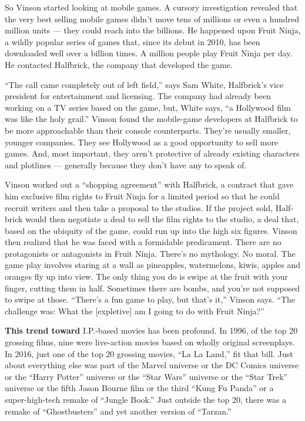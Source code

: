 So Vinson started looking at mobile games. A cursory investigation
revealed that the very best selling mobile games didn't move tens of
millions or even a hundred million units --- they could reach into the
billions. He happened upon Fruit Ninja, a wildly popular series of games
that, since its debut in 2010, has been downloaded well over a billion
times. A million people play Fruit Ninja per day. He contacted
Half­brick, the company that developed the game.

``The call came completely out of left field,'' says Sam White,
Half­brick's vice president for entertainment and licensing. The company
had already been working on a TV series based on the game, but, White
says, ``a Hollywood film was like the holy grail.'' Vinson found the
mobile-­game developers at Half­brick to be more approachable than their
console counterparts. They're usually smaller, younger companies. They
see Hollywood as a good opportunity to sell more games. And, most
important, they aren't protective of already existing characters and
plotlines --- generally because they don't have any to speak of.

Vinson worked out a ``shopping agreement'' with Half­brick, a contract
that gave him exclusive film rights to Fruit Ninja for a limited period
so that he could recruit writers and then take a proposal to the
studios. If the project sold, Half­brick would then negotiate a deal to
sell the film rights to the studio, a deal that, based on the ubiquity
of the game, could run up into the high six figures. Vinson then
realized that he was faced with a formidable predicament. There are no
protagonists or antagonists in Fruit Ninja. There's no mythology. No
moral. The game play involves staring at a wall as pineapples,
watermelons, kiwis, apples and oranges fly up into view. The only thing
you do is swipe at the fruit with your finger, cutting them in half.
Sometimes there are bombs, and you're not supposed to swipe at those.
``There's a fun game to play, but that's it,'' Vinson says. ``The
challenge was: What the {[}expletive{]} am I going to do with Fruit
Ninja?''

\textbf{This trend toward} I.P.-­based movies has been profound. In
1996, of the top 20 grossing films, nine were live-­action movies based
on wholly original screenplays. In 2016, just one of the top 20 grossing
movies, ``La La Land,'' fit that bill. Just about everything else was
part of the Marvel universe or the DC Comics universe or the ``Harry
Potter'' universe or the ``Star Wars'' universe or the ``Star Trek''
universe or the fifth Jason Bourne film or the third ``Kung Fu Panda''
or a super-­high-­tech remake of ``Jungle Book.'' Just outside the top
20, there was a remake of ``Ghostbusters'' and yet another version of
``Tarzan.''

